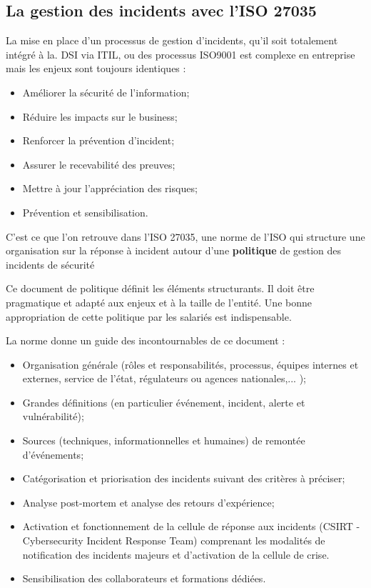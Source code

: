  \subsection{La gestion des incidents avec l'ISO 27035}
 
 
 La mise en place d'un processus de gestion d’incidents, qu'il soit totalement intégré à la. DSI via ITIL, ou des processus ISO9001 est complexe en entreprise mais les enjeux sont toujours identiques :
\begin{itemize}
  \item  Améliorer la sécurité de l’information;
  \item  Réduire les impacts sur le business;
  \item  Renforcer la prévention d’incident;
  \item  Assurer le recevabilité des preuves;
  \item  Mettre à jour l’appréciation des risques;
  \item  Prévention et sensibilisation.
\end{itemize}

  C'est ce que l'on retrouve dans l'ISO 27035, une norme de l'ISO qui structure  une organisation sur la réponse à incident autour d'une \textbf{politique} de gestion des incidents de sécurité

Ce document de politique définit les éléments structurants. Il doit être pragmatique et adapté aux enjeux et à la taille de l’entité. Une bonne appropriation de cette  politique par les salariés est indispensable. 

La norme donne un guide  des incontournables de ce document :

\begin{itemize}
  \item Organisation générale (rôles et responsabilités, processus, équipes internes et externes, service de l'état, régulateurs ou agences nationales,... );
  \item Grandes définitions  (en particulier événement, incident, alerte et vulnérabilité);
  \item Sources (techniques, informationnelles et humaines) de remontée d’événements;
  \item Catégorisation et priorisation des incidents suivant des critères à préciser;
  \item Analyse post-mortem et analyse des retours d’expérience;
  \item Activation et fonctionnement de la cellule de réponse aux incidents (CSIRT - Cybersecurity Incident Response Team) comprenant les modalités de notification des incidents majeurs et d’activation de la cellule de crise.
  \item Sensibilisation des collaborateurs et formations dédiées.
\end{itemize}

